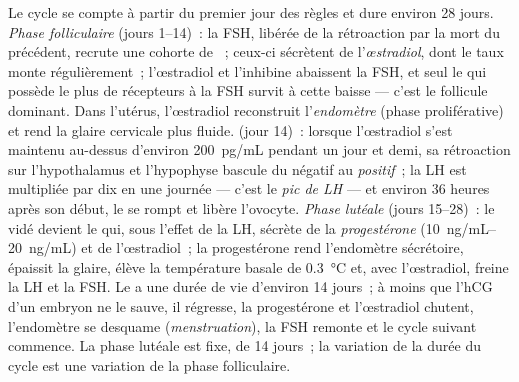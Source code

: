 \begin{definition}\label{def:b2:reproductive-hormones:cycle}
Le cycle se compte à partir du premier jour des règles et dure environ
28 jours. \emph{Phase folliculaire} (jours 1--14)~: la FSH, libérée de
la rétroaction par la mort du  précédent, recrute une
cohorte de ~; ceux-ci sécrètent de l'\emph{œstradiol}, dont le
taux monte régulièrement~; l'œstradiol et l'inhibine abaissent la FSH,
et seul le  qui possède le plus de récepteurs à la FSH survit
à cette baisse --- c'est le follicule dominant. Dans l'utérus,
l'œstradiol reconstruit l'\emph{endomètre} (phase proliférative) et rend
la glaire cervicale plus fluide. \emph{} (jour 14)~: lorsque
l'œstradiol s'est maintenu au-dessus d'environ \qty{200}{pg/mL}
pendant un jour et demi, sa rétroaction sur l'hypothalamus et
l'hypophyse bascule du négatif au \emph{positif}~; la LH est multipliée
par dix en une journée --- c'est le \emph{pic de LH} --- et environ
36 heures après son début, le  se rompt et libère l'ovocyte.
\emph{Phase lutéale} (jours
15--28)~: le  vidé devient le  qui, sous l'effet de
la LH, sécrète de la \emph{progestérone} (\qtyrange{10}{20}{ng/mL}) et
de l'œstradiol~; la progestérone rend l'endomètre sécrétoire, épaissit
la glaire, élève la température basale de \qty{0.3}{\celsius} et, avec
l'œstradiol, freine la LH et la FSH. Le  a une durée de vie
d'environ 14 jours~; à moins que l'hCG d'un embryon ne le sauve, il
régresse, la progestérone et l'œstradiol chutent, l'endomètre se
desquame (\emph{menstruation}), la FSH remonte et le cycle suivant
commence. La phase lutéale est fixe, de 14 jours~; la variation de la
durée du cycle est une variation de la phase folliculaire.
\end{definition}

